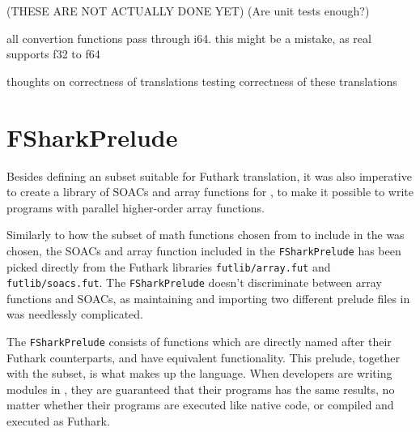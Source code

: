 (THESE ARE NOT ACTUALLY DONE YET)
(Are unit tests enough?)

all convertion functions pass through i64. this might be a mistake, as real
supports f32 to f64

thoughts on correctness of translations
testing correctness of these translations


\chapter{FSharkPrelude}
Besides defining an \fsharp{} subset suitable for Futhark translation, it was
also imperative to create a library of SOACs and array functions for \fshark{},
to make it possible to write programs with parallel higher-order array
functions.

Similarly to how the subset of math functions chosen from \fsharp{} to include in
the \fshark{} was chosen, the SOACs and array function included in the
\texttt{FSharkPrelude} has been picked directly from the Futhark libraries
\texttt{futlib/array.fut} and \texttt{futlib/soacs.fut}. The \texttt{FSharkPrelude} doesn't
discriminate between array functions and SOACs, as maintaining and importing two
different prelude files in \fshark{} was needlessly complicated.

The \texttt{FSharkPrelude} consists of functions which are directly named after
their Futhark counterparts, and have equivalent functionality.
This prelude, together with the \fshark{} subset, is what makes up the \fshark{} language.
When \fshark{} developers are writing modules in \fshark{}, they are guaranteed
that their \fshark{} programs has the same results, no matter whether their
programs are executed like native \fsharp{} code, or compiled and executed as
Futhark.

